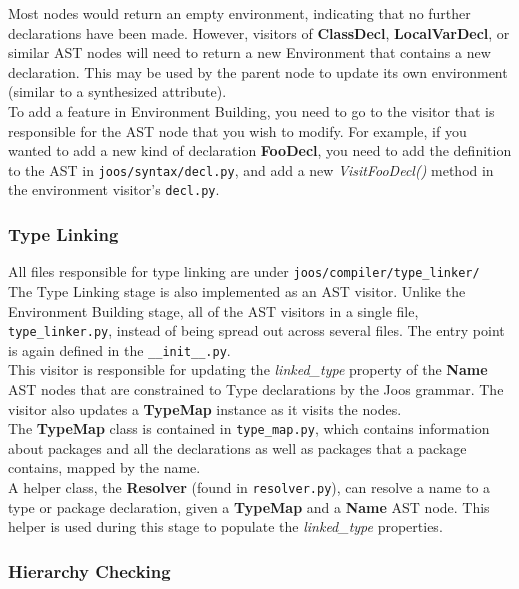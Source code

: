 \documentclass[12pt, a4paper]{article}
\newcommand{\class}{\textbf}
\newcommand{\method}{\textit}
\begin{document}
Most nodes would return an empty environment, indicating that no further declarations have been made. However, visitors of \class{ClassDecl}, \class{LocalVarDecl}, or similar AST nodes will need to return a new Environment that contains a new declaration. This may be used by the parent node to update its own environment (similar to a synthesized attribute). \\


To add a feature in Environment Building, you need to go to the visitor that is responsible for the AST node that you wish to modify. For example, if you wanted to add a new kind of declaration \class{FooDecl}, you need to add the definition to the AST in \verb|joos/syntax/decl.py|, and add a new \method{VisitFooDecl()} method in the environment visitor's \verb|decl.py|.



\subsubsection{Type Linking}

All files responsible for type linking are under \verb|joos/compiler/type_linker/| \\

The Type Linking stage is also implemented as an AST visitor. Unlike the Environment Building stage, all of the AST visitors in a single file, \verb|type_linker.py|, instead of being spread out across several files. The entry point is again defined in the \verb|__init__.py|. \\

This visitor is responsible for updating the \method{linked\_type} property of the \class{Name} AST nodes that are constrained to Type declarations by the Joos grammar. The visitor also updates a \class{TypeMap} instance as it visits the nodes.\\

The \class{TypeMap} class is contained in \verb|type_map.py|, which contains information about packages and all the declarations as well as packages that a package contains, mapped by the name. \\

A helper class, the \class{Resolver} (found in \verb|resolver.py|), can resolve a name to a type or package declaration, given a \class{TypeMap} and a \class{Name} AST node. This helper is used during this stage to populate the \method{linked\_type} properties.


\subsubsection{Hierarchy Checking}
\end{document}
